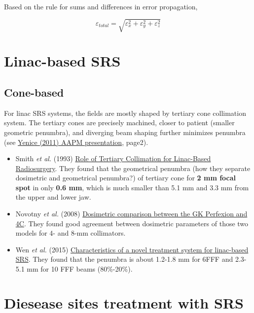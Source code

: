 \documentclass[]{book}
\providecommand{\tightlist}{%
  \setlength{\itemsep}{0pt}\setlength{\parskip}{0pt}}
\theoremstyle{definition}
\theoremstyle{definition}
\theoremstyle{definition}
\theoremstyle{remark}
\begin{document}
Based on the rule for sums and differences in error propagation,

\begin{equation*}
\varepsilon_{total}=\sqrt{\varepsilon_{x}^{2}+\varepsilon_{y}^{2}+\varepsilon_{z}^{2}}
\end{equation*}

\section{Linac-based SRS}\label{linac-based-srs}

\subsection{Cone-based}\label{cone-based}

For linac SRS systems, the fields are mostly shaped by tertiary cone
collimation system. The tertiary cones are precisely machined, closer to
patient (smaller geometric penumbra), and diverging beam shaping further
minimizes penumbra (see
\href{http://www.aapm.org/meetings/amos2/pdf/59-17160-8941-53.pdf}{Yenice
(2011) AAPM presentation}, page2).

\begin{itemize}
\tightlist
\item
  Smith \emph{et al.} (1993)
  \href{http://onlinelibrary.wiley.com/doi/10.1002/roi.2970010111/full}{Role
  of Tertiary Collimation for Linac-Based Radiosurgery}. They found that
  the geometrical penumbra (how they separate dosimetric and geometrical
  penumbra?) of tertiary cone for \textbf{2 mm focal spot} in only
  \textbf{0.6 mm}, which is much smaller than 5.1 mm and 3.3 mm from the
  upper and lower jaw.
\item
  Novotny \emph{et al.} (2008)
  \href{http://thejns.org/doi/pdf/10.3171/JNS/2008/109/12/S3}{Dosimetric
  comparison between the GK Perfexion and 4C}. They found good agreement
  between dosimetric parameters of those two models for 4- and 8-mm
  collimators.
\item
  Wen \emph{et al.} (2015)
  \href{http://onlinelibrary.wiley.com/doi/10.1120/jacmp.v16i4.5313/pdf}{Characteristics
  of a novel treatment system for linac-based SRS}. They found that the
  penumbra is about 1.2-1.8 mm for 6FFF and 2.3-5.1 mm for 10 FFF beams
  (80\%-20\%).
\end{itemize}

\section{Diesease sites treatment with
SRS}\label{diesease-sites-treatment-with-srs}
\end{document}
